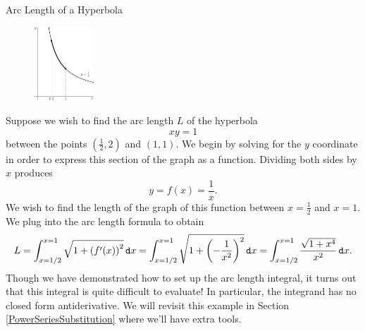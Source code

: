 \begin{example}{Arc Length of a Hyperbola}\label{HyperBocaBola}

	\begin{figure}
    	\centering
		\includegraphics[width=0.2\textwidth]{ChapterGeom/Figures/HyperbolaArcLength}
	\end{figure}

Suppose we wish to find the arc length $L$ of the hyperbola $$xy=1$$ between the points $\left(\frac{1}{2},2\right)$ and $\left(1,1\right)$.  We begin by solving for the $y$ coordinate in order to express this section of the graph as a function.  Dividing both sides by $x$ produces $$y=f(x)=\frac{1}{x}. $$  We wish to find the length of the graph of this function between $x=\frac{1}{2}$ and $x=1$.  We plug into the arc length formula to obtain $$L= \int_{x=1/2}^{x=1} \sqrt{1+\left( f'(x)\right)^2 } \mathop{}\!\mathtt{d} x= \int_{x=1/2}^{x=1} \sqrt{1+\left( -\frac{1}{x^2}\right)^2 } \mathop{}\!\mathtt{d} x=\int_{x=1/2}^{x=1} \frac{\sqrt{1+x^4}}{x^2} \mathop{}\!\mathtt{d} x. $$ Though we have demonstrated how to set up the arc length integral, it turns out that this integral is quite difficult to evaluate!  In particular, the integrand has no closed form antiderivative.  We will revisit this example in Section \ref{PowerSeriesSubstitution} where we'll have extra tools. 
\end{example}
